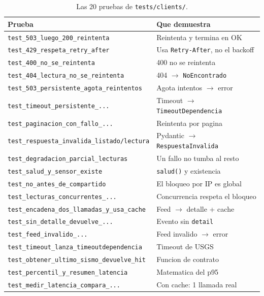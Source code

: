 \documentclass[11pt,a4paper]{article}
\newcommand{\arch}[1]{\texttt{#1}}
\begin{document}
\begin{table}[H]
\centering
\small
\begin{tabular}{p{7.6cm} p{6.6cm}}
\toprule
\textbf{Prueba} & \textbf{Que demuestra} \\
\midrule
\arch{test\_503\_luego\_200\_reintenta} & Reintenta y termina en OK \\
\arch{test\_429\_respeta\_retry\_after} & Usa \arch{Retry-After}, no el backoff \\
\arch{test\_400\_no\_se\_reintenta} & 400 no se reintenta \\
\arch{test\_404\_lectura\_no\_se\_reintenta} & 404 $\to$ \arch{NoEncontrado} \\
\arch{test\_503\_persistente\_agota\_reintentos} & Agota intentos $\to$ error \\
\arch{test\_timeout\_persistente\_...} & Timeout $\to$ \arch{TimeoutDependencia} \\
\arch{test\_paginacion\_con\_fallo\_...} & Reintenta por pagina \\
\arch{test\_respuesta\_invalida\_listado/lectura} & Pydantic $\to$ \arch{RespuestaInvalida} \\
\arch{test\_degradacion\_parcial\_lecturas} & Un fallo no tumba al resto \\
\arch{test\_salud\_y\_sensor\_existe} & \arch{salud()} y existencia \\
\arch{test\_no\_antes\_de\_compartido} & El bloqueo por IP es global \\
\arch{test\_lecturas\_concurrentes\_...} & Concurrencia respeta el bloqueo \\
\midrule
\arch{test\_encadena\_dos\_llamadas\_y\_usa\_cache} & Feed $\to$ detalle + cache \\
\arch{test\_sin\_detalle\_devuelve\_...} & Evento sin \arch{detail} \\
\arch{test\_feed\_invalido\_...} & Feed invalido $\to$ error \\
\arch{test\_timeout\_lanza\_timeoutdependencia} & Timeout de USGS \\
\arch{test\_obtener\_ultimo\_sismo\_devuelve\_hit} & Funcion de contrato \\
\arch{test\_percentil\_y\_resumen\_latencia} & Matematica del p95 \\
\arch{test\_medir\_latencia\_compara\_...} & Con cache: 1 llamada real \\
\bottomrule
\end{tabular}
\caption{Las 20 pruebas de \arch{tests/clients/}.}
\end{table}
\end{document}
